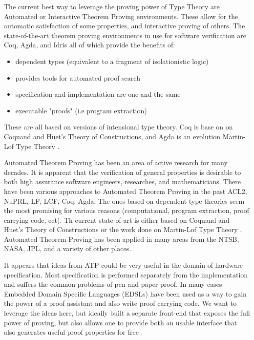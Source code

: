 \documentclass[12pt, titlepage]{article}
\begin{document}
The current best way to leverage the proving power of Type Theory are Automated or Interactive Theorem Proving
environments. These allow for the automatic satisfaction of some properties, and interactive proving of others.
The state-of-the-art theorem proving environments in use for software verification are Coq, Agda, and Idris 
all of which provide the benefits of:
\begin{itemize}
    \item dependent types (equivalent to a fragment of isolationistic logic)
    \item provides tools for automated proof search
    \item specification and implementation are one and the same
    \item executable "proofs" (i.e program extraction)
\end{itemize}

These are all based on versions of intensional type theory. Coq is base on
on Coquand and Huet's Theory of Constructions, and Agda is an evolution 
Martin-Lof Type Theory \cite{martinlof}.

Automated Theorem Proving has been an area of active research for many decades. It is apparent that the
verification of general properties is desirable to both high assurance software engineers, researches, and
mathematicians. There have been various approaches to Automated Theorem Proving in the past ACL2, NuPRL, LF,
LCF, Coq, Agda. The ones based on dependent type theories seem the most promising for various reasons 
(computational, program extraction, proof carrying code, ect). Th current state-of-art is either based
on Coquand and Huet's Theory of Constructions or the work done on Martin-Lof Type Theory \cite{martinlof}.
Automated Theorem Proving has been applied in many areas from the NTSB, NASA, JPL, and a variety of other places.

It appears that ideas from ATP could be very useful in the domain of hardware specification. Most
specification is performed separately from the implementation and suffers the common
problems of pen and paper proof. In many cases Embedded Domain Specific Languages (EDSLs)
have been used as a way to gain the power of a proof assistant and also write proof carrying code\cite{Ricketts:2014}\cite{fesi}. We want
to leverage the ideas here, but ideally built a separate front-end that exposes the full power of proving,
but also allows one to provide both an usable interface that also generates useful proof properties for
free \cite{Ricketts:2014}. \cite{chlipala2011certified} \cite{Pierce:SF}
\end{document}
